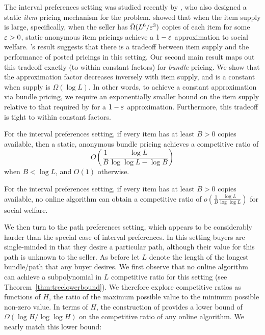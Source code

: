 The interval preferences setting was studied recently by
\citet{CDH+17}, who also designed a static {\em item} pricing
mechanism for the problem. \citeauthor{CDH+17} showed that when the
item supply is large, specifically, when the seller has
$\tilde\Omega(L^6/\varepsilon^3)$ copies of each item for some $\varepsilon>0$,
static anonymous item pricings achieve a $1-\varepsilon$ approximation to
social welfare. \citeauthor{CDH+17}'s result suggests that there is a
tradeoff between item supply and the performance of posted pricings in
this setting. Our second main result maps out this tradeoff exactly
(to within constant factors) for {\em bundle} pricing. We show that
the approximation factor decreases inversely with item supply, and is
a constant when supply is $\Omega(\log L)$.  In other words, to
achieve a constant approximation via bundle pricing, we require an
exponentially smaller bound on the item supply relative to that
required by \citeauthor{CDH+17} for a $1-\varepsilon$
approximation. Furthermore, this tradeoff is tight to within constant
factors. 

\begin{theorem}
\label{cor:large-cap-ub}
For the interval preferences setting, if every item has at least $B>0$
copies available, then a static, anonymous bundle pricing achieves a
competitive ratio of
\[
    O\left(\frac1B\frac{\log L}{\log\log L - \log B}\right)
\] 
when $B<\log L$, and $O(1)$ otherwise.
\end{theorem}

\begin{theorem}
\label{thm:lb}
For the interval preferences setting, if every item has at least $B>0$
copies available, no online algorithm can obtain a competitive ratio
of $o\left(\frac1B\frac{\log L}{\log\log L}\right)$ for social
welfare.
\end{theorem}

We then turn to the path preferences setting, which appears to be
considerably harder than the special case of interval
preferences. %
In this setting buyers are single-minded in that they desire a
particular path, although their value for this path
is unknown to the seller. As before let $L$ denote the length of the
longest bundle/path that any buyer desires. We first observe that no
online algorithm can achieve a subpolynomial in $L$ competitive ratio
for this setting (see Theorem~\ref{thm:treelowerbound}). We therefore
explore competitive ratios as functions of $H$, the ratio of the
maximum possible value to the minimum possible non-zero value. In
terms of $H$, the construction of \citet{im2011secretary} provides a
lower bound of $\Omega(\log H/\log\log H)$ on the competitive ratio of
any online algorithm. We nearly match this lower bound:

